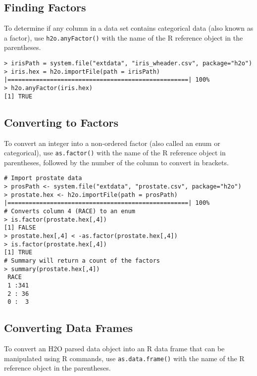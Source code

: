 {{\subsection{Finding Factors}

To determine if any column in a data set contains categorical data (also known as a factor), use {\texttt{h2o.anyFactor()}} with the name of the R reference object in the parentheses.
\begin{lstlisting}[style=R]
> irisPath = system.file("extdata", "iris_wheader.csv", package="h2o")
> iris.hex = h2o.importFile(path = irisPath)
|===================================================| 100%
> h2o.anyFactor(iris.hex)
[1] TRUE
\end{lstlisting}

\subsection{Converting to Factors}
To convert an integer into a non-ordered factor (also called an enum or categorical), use {\texttt{as.factor()}} with the name of the R reference object in parentheses, followed by the number of the column to convert in brackets.

\begin{lstlisting}[style=R]
# Import prostate data
> prosPath <- system.file("extdata", "prostate.csv", package="h2o")
> prostate.hex <- h2o.importFile(path = prosPath)
|===================================================| 100%
# Converts column 4 (RACE) to an enum
> is.factor(prostate.hex[,4])
[1] FALSE
> prostate.hex[,4] < -as.factor(prostate.hex[,4])
> is.factor(prostate.hex[,4])
[1] TRUE
# Summary will return a count of the factors
> summary(prostate.hex[,4])
 RACE   
 1 :341 
 2 : 36 
 0 :  3 
\end{lstlisting}

\subsection{Converting Data Frames}

\normalsize

To convert an H2O parsed data object into an R data frame that can be manipulated using R commands, use {\texttt{as.data.frame()}} with the name of the R reference object in the parentheses.

}}
